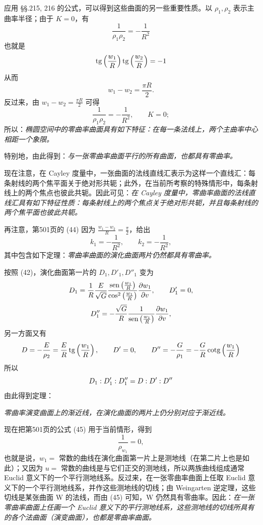 应用 \S\S.215, 216 的公式，可以得到这些曲面的另一些重要性质。以 $\rho_1,\rho_2$ 表示主曲率半径；由于 $K=0$，有
\[
\frac1{\rho_1\rho_2}=-\frac1{R^2}
\]
也就是
\[
\operatorname{tg}\left(\frac{w_1}{R}\right)\operatorname{tg}\left(\frac{w_2}{R}\right)=-1
\]
从而
\[
w_1-w_2=\frac{\pi R}{2}.
\]
反过来，由 $w_1-w_2=\frac{\pi R}{2}$ 可得
\[
\frac1{\rho_1\rho_2}=-\frac1{R^2},\qquad K=0;
\]
所以：\emph{椭圆空间中的零曲率曲面具有如下特征：在每一条法线上，两个主曲率中心相距一个象限。}

特别地，由此得到：\emph{与一张零曲率曲面平行的所有曲面，也都具有零曲率。}

现在注意，在 Cayley 度量中，一张曲面的法线直线汇表示为这样一个直线汇：每条射线的两个焦平面关于绝对形共轭；此外，在当前所考察的特殊情形中，每条射线上的两个焦点也彼此共轭。因此可见：\emph{在 Cayley 度量中，零曲率曲面的法线直线汇具有如下特征性质：每条射线上的两个焦点关于绝对形共轭，并且每条射线的两个焦平面也彼此共轭。}

再注意，第501页的 (44) 因为 $\frac{w_1-w_2}{R}=\frac\pi2$，给出
\[
k_1=-\frac1{R^2},\qquad k_2=-\frac1{R^2},
\]
其中包含如下定理：\emph{零曲率曲面的演化曲面两片仍然都具有零曲率。}

按照 (42)，演化曲面第一片的 $D_1,D'_1,D''_1$ 变为
\[
D_1=\frac1R\frac{E}{\sqrt G}
\frac{\operatorname{sen}\left(\frac{w_1}{R}\right)}{\cos^2\left(\frac{w_1}{R}\right)}
\frac{\partial w_1}{\partial v},\qquad D'_1=0,
\]
\[
D''_1=-\frac{\sqrt G}{R}\frac1{\operatorname{sen}\left(\frac{w_1}{R}\right)}
\frac{\partial w_1}{\partial v},
\]
另一方面又有
\[
D=-\frac{E}{\rho_2}=\frac{E}{R}\operatorname{tg}\left(\frac{w_1}{R}\right),\qquad D'=0,
\qquad D''=-\frac{G}{\rho_1}=-\frac{G}{R}\operatorname{cotg}\left(\frac{w_1}{R}\right)
\]
所以
\[
D_1:D'_1:D''_1=D:D':D''
\]
由此得到定理：

\emph{零曲率演变曲面上的渐近线，在演化曲面的两片上仍分别对应于渐近线。}

现在把第501页的公式 (45) 用于当前情形，得到
\[
\frac1{\rho_{w_1}}=0,
\]
也就是说，$w_1=$ 常数的曲线在演化曲面第一片上是测地线（在第二片上也是如此）；又因为 $u=$ 常数的曲线是与它们正交的测地线，所以两族曲线组成通常 Euclid 意义下的一个平行测地线系。反过来，在一张零曲率曲面上任取 Euclid 意义下的一个平行测地线系，并作这些测地线的切线；由 Weingarten 逆定理，这些切线是某张曲面 W 的法线，而由 (45) 可知，W 仍然具有零曲率。因此：\emph{在一张零曲率曲面上任画一个 Euclid 意义下的平行测地线系，这些测地线的切线所具有的各个法曲面（演变曲面），也都是零曲率曲面。}

